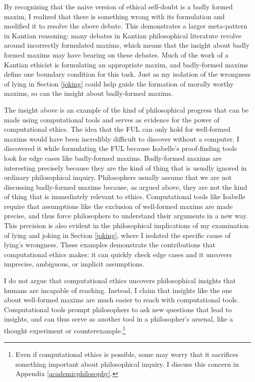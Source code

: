 \begin{isabellebody}
\begin{isamarkuptext}
By recognizing that the naive version of ethical self-doubt is a badly formed maxim, I realized 
that there is something wrong with its formulation and modified it to resolve the above debate. 
This demonstrates a larger meta-pattern in Kantian reasoning: many debates in Kantian philosophical
literature revolve around incorrectly formulated maxims, which means that the insight about badly
formed maxims may have bearing on these debates. Much of the work of a Kantian ethicist is formulating an
appropriate maxim, and badly-formed maxims define one boundary condition for this task. Just as my isolation
of the wrongness of lying in Section \ref{joking} could help guide the formation of morally worthy maxims, 
so can the insight about badly-formed maxims.%
\end{isamarkuptext}\isamarkuptrue%
%
\isadelimdocument
%
\endisadelimdocument
%
\isatagdocument
%
\isamarkuptrue%
%
\endisatagdocument
{\isafolddocument}%
%
\isadelimdocument
%
\endisadelimdocument
%
\begin{isamarkuptext}%
The insight above is an example of the kind of philosophical progress that can be 
made using computational tools and serves as evidence for the power of computational ethics. The 
idea that the FUL can only hold for well-formed maxims would have been
incredibly difficult to discover without a computer. I discovered it while formulating the FUL because 
Isabelle's proof-finding tools look for edge cases like badly-formed maxims. Badly-formed maxims are 
interesting precisely because they are the kind of thing that is usually ignored in ordinary philosophical inquiry. 
Philosophers usually assume that we are not discussing badly-formed maxims because, as argued above, 
they are not the kind of thing that is immediately relevant to ethics. Computational tools like Isabelle
require that assumptions like the exclusion of well-formed maxims are made precise, and thus force 
philosophers to understand their arguments in a new way. This precision is also evident in the philosophical 
implications of my examination of lying and joking in Section \ref{joking}, where I isolated the 
specific cause of lying's wrongness. These examples demonstrate the contributions
that computational ethics makes: it can quickly check edge cases and it uncovers imprecise, ambiguous,
or implicit assumptions.

I do not argue that computational ethics uncovers philosophical insights that humans are incapable 
of reaching. Instead, I claim that insights like the one about well-formed maxims are much easier
to reach with computational tools. Computational 
tools prompt philosophers to ask new questions that 
lead to insights, and can thus serve as another tool in a philosopher's arsenal, like a 
thought experiment or counterexample.\footnote{Even if computational ethics is possible, some may 
worry that it sacrifices something important about philosophical inquiry. I discuss this concern in Appendix 
\ref{academicphilosophy}.}


\end{isamarkuptext}
\end{isabellebody}
